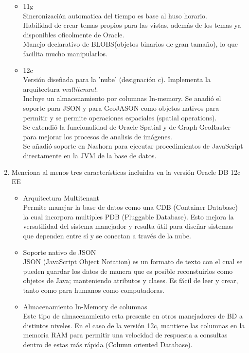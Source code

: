 \documentclass[10pt]{article}
\begin{document}
\begin{enumerate}
\begin{itemize}
{			}
			\item {
				11g \\
				Sincronización automatica del tiempo es base al huso horario. \\
				Habilidad de crear temas propios para las vistas, además de los 
				temas ya disponibles oficolmente de Oracle. \\
				Manejo declarativo de BLOBS(objetos binarios de gran tamaño), lo que
				facilita mucho manipularlos.
			}
			\item {12c \\
                Versión diseñada para la 'nube' (designación c).
                Implementa la arquitectura \textit{multitenant}.\\
                Incluye un almacenamiento por columnas In-memory.
				Se anadió el soporte para JSON  y para GeoJASON como objetos 
				nativos para permitir y se permite operaciones espaciales 
				(spatial operations).\\
				Se extendió la funcionalidad de Oracle Spatial y de Graph 
				GeoRaster para mejorar los procesos de analisis de imágenes. \\
				Se añadió soporte en Nashorn para ejecutar procedimientos de 
				JavaScript directamente en la JVM de la base de datos.
				}
		\end{itemize}
        \item Menciona al menos tres características incluidas en la versión Oracle DB 12c EE\\
		\begin{itemize}
			\item {
                Arquitectura Multitenant \\
                Permite manejar la base de datos como una CDB (Container Database) la cual incorpora multiples PDB (Pluggable Database). Esto mejora la versatilidad del sistema manejador y resulta útil para diseñar sistemas que dependen entre sí y se conectan a través de la nube. 
			}
			\item {
                Soporte nativo de JSON \\
                JSON (JavaScript Object Notation) es un formato de texto con el cual se pueden guardar los datos de manera que es posible reconstuirlos como objetos de Java; manteniendo atributos y clases. Es fácil de leer y crear, tanto como para humanos como computadoras.
			}
			\item {
                Almacenamiento In-Memory de columnas \\
                Este tipo de almacenamiento esta presente en otros manejadores de BD a distintos niveles. En el caso de la versión 12c, mantiene las columnas en la memoria RAM para permitir una velocidad de respuesta a consultas dentro de estas más rápida (Column oriented Database).
			}
		\end{itemize}
	
	\end{enumerate}
\end{document}
